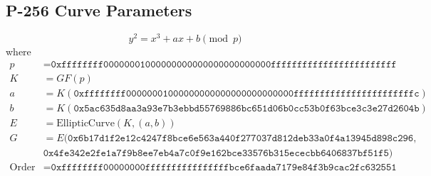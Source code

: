 \documentclass[12pt]{article}
\begin{document}
\subsection*{P-256 Curve Parameters}
\[
y^2 = x^3 + a x + b \pmod p
\]
where
\begin{align*}
p &= \texttt{0xffffffff00000001000000000000000000000000ffffffffffffffffffffffff} \\
K &= GF(p) \\
a &= K(\texttt{0xffffffff00000001000000000000000000000000fffffffffffffffffffffffc}) \\
b &= K(\texttt{0x5ac635d8aa3a93e7b3ebbd55769886bc651d06b0cc53b0f63bce3c3e27d2604b}) \\
E &= \text{EllipticCurve}(K, (a, b)) \\
G &= E(\texttt{0x6b17d1f2e12c4247f8bce6e563a440f277037d812deb33a0f4a13945d898c296}, \\
     & \texttt{0x4fe342e2fe1a7f9b8ee7eb4a7c0f9e162bce33576b315ececbb6406837bf51f5}) \\
\text{Order} &= \texttt{0xffffffff00000000ffffffffffffffffbce6faada7179e84f3b9cac2fc632551}
\end{align*}
\end{document}
